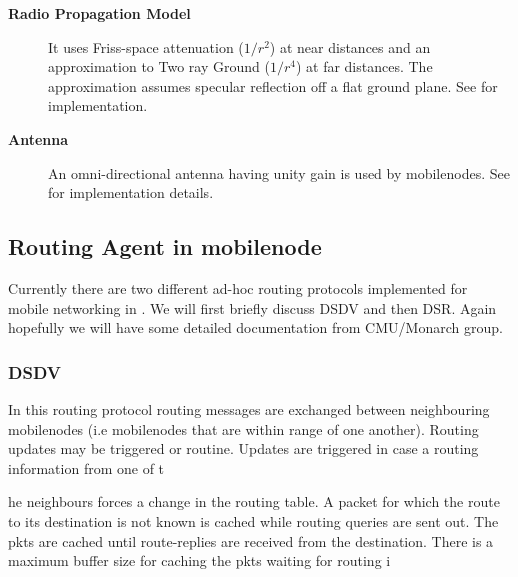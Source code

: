 \begin{description}
\item[{\bf Radio Propagation Model}]  It uses Friss-space attenuation ($1/r^2$) at near distances and an approximation to Two ray Ground ($1/r^4$) at far distances. The approximation assumes specular reflection off a flat ground plane. See  for implementation.

\item[{\bf Antenna}] An omni-directional antenna having unity gain is used by mobilenodes. See  for implementation details.
\end{description}

\subsection{Routing Agent in mobilenode}
\label{sec:mobilenode-routing}

Currently there are two different ad-hoc routing protocols implemented for mobile networking in \ns. We will first briefly discuss DSDV and then DSR. Again hopefully we will have some detailed documentation from CMU/Monarch group.

\subsubsection{DSDV}
\label{sec:dsdv}

In this routing protocol routing messages are exchanged between neighbouring mobilenodes (i.e mobilenodes that are within range of one another). Routing updates may be triggered or routine. Updates are triggered in case a routing information from one of t









he neighbours forces a change in the routing table.
A packet for which the route to its destination is not known is cached while routing queries are sent out. The pkts are cached until route-replies are received from the destination. There is a maximum buffer size for caching the pkts waiting for routing i










